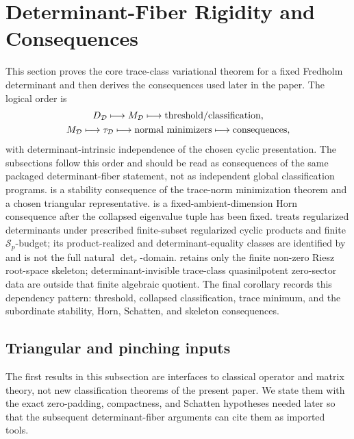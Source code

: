 \section{Determinant-Fiber Rigidity and Consequences}\label{sec:trace-class-determinant-fiber-rigidity}

This section proves the core trace-class variational theorem for a fixed
Fredholm determinant and then derives the consequences used later in the
paper.  The logical order is
\[
  \begin{gathered}
  D_{\mathcal D}\longmapsto M_{\mathcal D}
  \longmapsto \textup{threshold/classification},\\
  M_{\mathcal D}\longmapsto \tau_{\mathcal D}
  \longmapsto \textup{normal minimizers}
  \longmapsto \textup{consequences},
  \end{gathered}
\]
with determinant-intrinsic independence of the chosen cyclic presentation.
The subsections follow this order and should be read as consequences of the
same packaged determinant-fiber statement, not as independent global
classification programs.
 is a stability consequence of the
trace-norm minimization theorem and a chosen triangular representative.
 is a fixed-ambient-dimension
Horn consequence after the collapsed eigenvalue tuple has been fixed.
   treats regularized
  determinants under prescribed finite-subset regularized cyclic products and finite
  \(\mathcal S_p\)-budget; its product-realized and determinant-equality
  classes are identified by
 and is not the full natural
\(\det_r\)-domain.
 retains only the finite non-zero
Riesz root-space skeleton; determinant-invisible trace-class quasinilpotent
zero-sector data are outside that finite algebraic quotient.  The final
corollary records this dependency pattern: threshold, collapsed classification,
trace minimum, and the subordinate stability, Horn, Schatten, and skeleton
consequences.

\subsection{Triangular and pinching inputs}

The first results in this subsection are interfaces to classical operator
and matrix theory, not new classification theorems of the present paper.  We
state them with the exact zero-padding, compactness, and Schatten hypotheses
needed later so that the subsequent determinant-fiber arguments can cite them
as imported tools.

